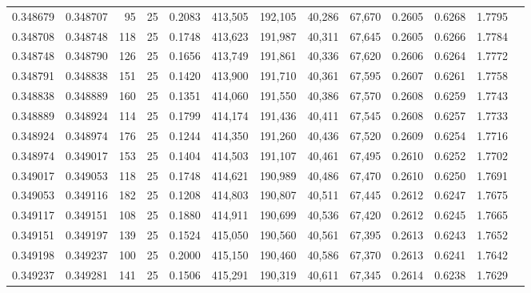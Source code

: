 \begin{tabular}{rrrrrrrrrrrrr}
0.348679 & 0.348707 &    95 &  25 &                                     0.2083 & 413,505 & 192,105 &  40,286 &  67,670 & 0.2605 & 0.6268 & 1.7795 \\
0.348708 & 0.348748 &   118 &  25 &                                     0.1748 & 413,623 & 191,987 &  40,311 &  67,645 & 0.2605 & 0.6266 & 1.7784 \\
0.348748 & 0.348790 &   126 &  25 &                                     0.1656 & 413,749 & 191,861 &  40,336 &  67,620 & 0.2606 & 0.6264 & 1.7772 \\
0.348791 & 0.348838 &   151 &  25 &                                     0.1420 & 413,900 & 191,710 &  40,361 &  67,595 & 0.2607 & 0.6261 & 1.7758 \\
0.348838 & 0.348889 &   160 &  25 &                                     0.1351 & 414,060 & 191,550 &  40,386 &  67,570 & 0.2608 & 0.6259 & 1.7743 \\
0.348889 & 0.348924 &   114 &  25 &                                     0.1799 & 414,174 & 191,436 &  40,411 &  67,545 & 0.2608 & 0.6257 & 1.7733 \\
0.348924 & 0.348974 &   176 &  25 &                                     0.1244 & 414,350 & 191,260 &  40,436 &  67,520 & 0.2609 & 0.6254 & 1.7716 \\
0.348974 & 0.349017 &   153 &  25 &                                     0.1404 & 414,503 & 191,107 &  40,461 &  67,495 & 0.2610 & 0.6252 & 1.7702 \\
0.349017 & 0.349053 &   118 &  25 &                                     0.1748 & 414,621 & 190,989 &  40,486 &  67,470 & 0.2610 & 0.6250 & 1.7691 \\
0.349053 & 0.349116 &   182 &  25 &                                     0.1208 & 414,803 & 190,807 &  40,511 &  67,445 & 0.2612 & 0.6247 & 1.7675 \\
0.349117 & 0.349151 &   108 &  25 &                                     0.1880 & 414,911 & 190,699 &  40,536 &  67,420 & 0.2612 & 0.6245 & 1.7665 \\
0.349151 & 0.349197 &   139 &  25 &                                     0.1524 & 415,050 & 190,560 &  40,561 &  67,395 & 0.2613 & 0.6243 & 1.7652 \\
0.349198 & 0.349237 &   100 &  25 &                                     0.2000 & 415,150 & 190,460 &  40,586 &  67,370 & 0.2613 & 0.6241 & 1.7642 \\
0.349237 & 0.349281 &   141 &  25 &                                     0.1506 & 415,291 & 190,319 &  40,611 &  67,345 & 0.2614 & 0.6238 & 1.7629 \\

\end{tabular}

